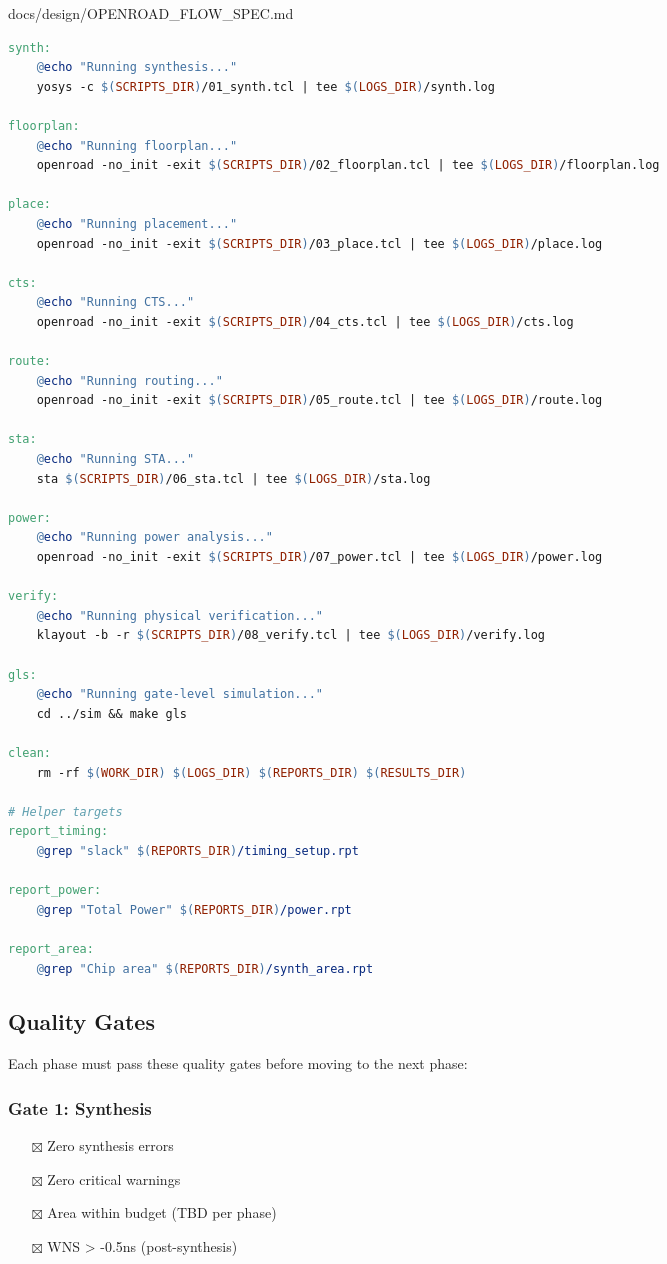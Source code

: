 \begin{relocated}{docs/design/OPENROAD_FLOW_SPEC.md}
\begin{lstlisting}[language=make]
synth:
    @echo "Running synthesis..."
    yosys -c $(SCRIPTS_DIR)/01_synth.tcl | tee $(LOGS_DIR)/synth.log

floorplan:
    @echo "Running floorplan..."
    openroad -no_init -exit $(SCRIPTS_DIR)/02_floorplan.tcl | tee $(LOGS_DIR)/floorplan.log

place:
    @echo "Running placement..."
    openroad -no_init -exit $(SCRIPTS_DIR)/03_place.tcl | tee $(LOGS_DIR)/place.log

cts:
    @echo "Running CTS..."
    openroad -no_init -exit $(SCRIPTS_DIR)/04_cts.tcl | tee $(LOGS_DIR)/cts.log

route:
    @echo "Running routing..."
    openroad -no_init -exit $(SCRIPTS_DIR)/05_route.tcl | tee $(LOGS_DIR)/route.log

sta:
    @echo "Running STA..."
    sta $(SCRIPTS_DIR)/06_sta.tcl | tee $(LOGS_DIR)/sta.log

power:
    @echo "Running power analysis..."
    openroad -no_init -exit $(SCRIPTS_DIR)/07_power.tcl | tee $(LOGS_DIR)/power.log

verify:
    @echo "Running physical verification..."
    klayout -b -r $(SCRIPTS_DIR)/08_verify.tcl | tee $(LOGS_DIR)/verify.log

gls:
    @echo "Running gate-level simulation..."
    cd ../sim && make gls

clean:
    rm -rf $(WORK_DIR) $(LOGS_DIR) $(REPORTS_DIR) $(RESULTS_DIR)

# Helper targets
report_timing:
    @grep "slack" $(REPORTS_DIR)/timing_setup.rpt

report_power:
    @grep "Total Power" $(REPORTS_DIR)/power.rpt

report_area:
    @grep "Chip area" $(REPORTS_DIR)/synth_area.rpt
\end{lstlisting}

\subsection{Quality Gates}\label{tm:pd:openroad-flow:quality-gates}

Each phase must pass these quality gates before moving to the next
phase:

\subsubsection{Gate 1: Synthesis}\label{tm:pd:openroad-flow:gate-1-synthesis}

\begin{itemize}
\tightlist
\item[$\boxtimes$]
  Zero synthesis errors
\item[$\boxtimes$]
  Zero critical warnings
\item[$\boxtimes$]
  Area within budget (TBD per phase)
\item[$\boxtimes$]
  WNS \textgreater{} -0.5ns (post-synthesis)
\end{itemize}


\end{relocated}
